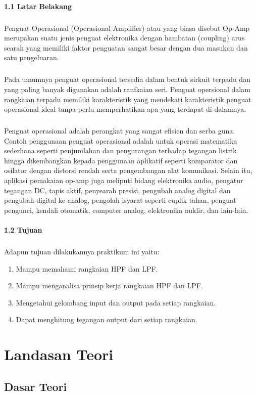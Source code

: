 \documentclass[12pt,a4paper]{article}
\begin{document}
\paragraph{1.1 Latar Belakang}
\subparagraph{ }
	Penguat Operasional (Operasional Amplifier) atau yang biasa disebut Op-Amp merupakan suatu jenis penguat elektronika dengan hambatan (coupling) arus searah yang memiliki faktor penguatan sangat besar dengan dua masukan dan satu pengeluaran.
\subparagraph{ }
	Pada umumnya penguat operasional tersedia dalam bentuk sirkuit terpadu dan yang paling banyak digunakan adalah ranfkaian seri. Penguat opersional dalam rangkaian terpadu memiliki karakteristik yang mendekati karakteristik penguat operasional ideal tanpa perlu memperhatikan apa yang terdapat di dalamnya.
\subparagraph{ }
Penguat operasional adalah perangkat yang sangat efisien dan serba guna. Contoh penggunaan penguat operasional adalah untuk operasi matematika sederhana seperti penjumlahan dan pengurangan terhadap tegangan listrik hingga dikembangkan kepada penggunaan aplikatif seperti komparator dan osilator dengan distorsi rendah serta pengembangan alat komunikasi. Selain itu, aplikasi pemakaian op-amp juga meliputi bidang elektronika audio, pengatur tegangan DC, tapis aktif, penyearah presisi, pengubah analog digital dan pengubah digital ke analog, pengolah isyarat seperti cuplik tahan, penguat pengunci, kendali otomatik, computer analog, elektronika nuklir, dan lain-lain.

\paragraph{1.2 Tujuan}
\subparagraph{ }
Adapun tujuan dilakukannya praktikum ini yaitu:
\begin{enumerate}
\item Mampu memahami rangkaian HPF dan LPF.
\item Mampu menganalisa prinsip kerja rangkaian HPF dan LPF.
\item Mengetahui gelombang input dan output pada setiap rangkaian.
\item Dapat menghitung tegangan output dari setiap rangkaian.
\end{enumerate}


\newpage
\section{Landasan Teori}
\subsection{Dasar Teori}
\end{document}
